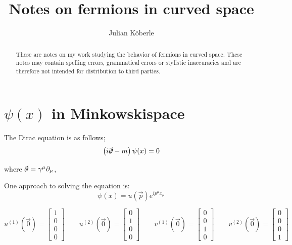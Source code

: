 \documentclass[12pt,a4paper]{article}
\author{Julian Köberle}
\title{Notes on fermions in curved space}
\begin{document}
	\maketitle
	
	\newcommand{\np}{\slashed{\partial}}
	\newcommand{\nG}{\slashed{\Gamma}}
	\newcommand{\nn}{\slashed{\nabla}}
	\newcommand{\overbar}[1]{\mkern 1.5mu\overline{\mkern-1.5mu#1\mkern-1.5mu}\mkern 1.5mu}\textbf{}
	
	
	\newcommand{\tensor}[3]{{#1}^{#2}_{#3}}
	
	
	\begin{abstract}
		These are notes on my work studying the behavior of fermions in curved space. These notes may contain spelling errors, grammatical errors or stylistic inaccuracies and are therefore not intended for distribution to third parties.
		
	\end{abstract}
	
	\tableofcontents 
	
	
	\section{$\psi(x)$ in Minkowskispace}
	The Dirac equation is as follows;
	\begin{equation}
		\label{diracEq}
		\left( i \np -m \right) \psi(x) = 0 
	\end{equation}

	where $\np = \gamma^\mu \partial_\mu$,
	
	One approach to solving the equation is:
	$$
	\psi(x) = u(\vec{p}) e^{i p^\mu x_\mu}
	$$
	
	$$
	u^{(1)}\left({\vec {0}}\right)={\begin{bmatrix}1\\0\\0\\0\end{bmatrix}}\qquad u^{(2)}\left({\vec {0}}\right)={\begin{bmatrix}0\\1\\0\\0\end{bmatrix}}\qquad v^{(1)}\left({\vec {0}}\right)={\begin{bmatrix}0\\0\\1\\0\end{bmatrix}}\qquad v^{(2)}\left({\vec {0}}\right)={\begin{bmatrix}0\\0\\0\\1\end{bmatrix}}
	$$
	
\end{document}
